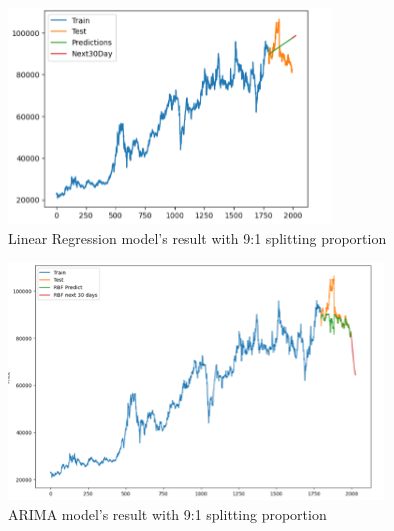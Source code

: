 \documentclass{ieeeojies}
\begin{document}
\begin{figure}[H]
  \centering
  \begin{minipage}{0.8\linewidth}
    \centering
    \includegraphics[width=\linewidth]{bibliography/LN_VCB91.png}
    \caption{Linear Regression model's result with 9:1 splitting proportion}
    \label{fig8}
  \end{minipage}
\end{figure}
\begin{figure}[H]
  \centering
  \begin{minipage}{0.8\linewidth}
    \centering
    \includegraphics[width=\linewidth]{bibliography/SVR_VCB91.png}
    \caption{ARIMA model's result with 9:1 splitting proportion}
    \label{fig9}
  \end{minipage}
\end{figure}
\end{document}
